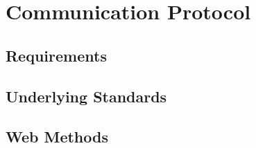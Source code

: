 \chapter{Communication Protocol}

\section{Requirements}

\section{Underlying Standards}

\section{Web Methods}
